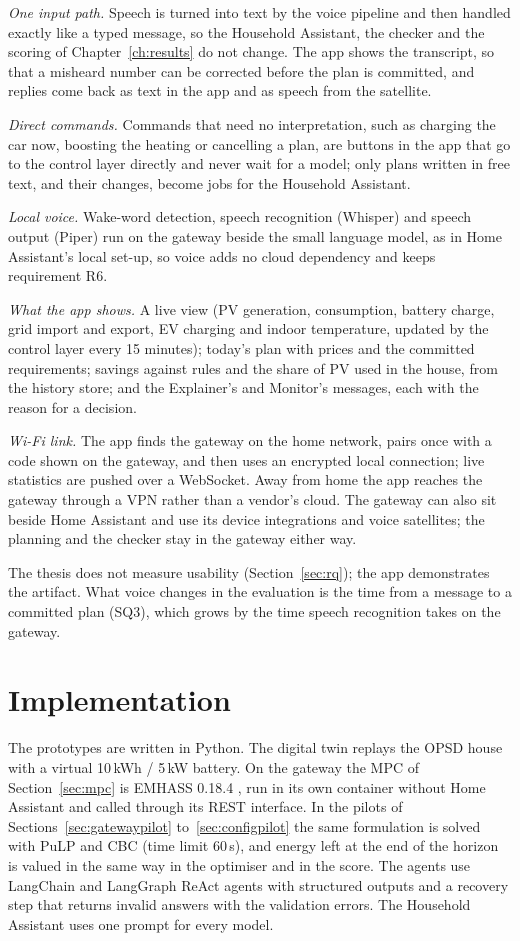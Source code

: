\textit{One input path.} Speech is turned into text by the voice
pipeline and then handled exactly like a typed message, so the Household Assistant,
the checker and the scoring of Chapter~\ref{ch:results} do not change.
The app shows the transcript, so that a misheard number can be corrected
before the plan is committed, and replies come back as text in the app
and as speech from the satellite.

\textit{Direct commands.} Commands that need no interpretation, such as
charging the car now, boosting the heating or cancelling a plan, are
buttons in the app that go to the control layer directly and never wait
for a model; only plans written in free text, and their changes, become
jobs for the Household Assistant.

\textit{Local voice.} Wake-word detection, speech recognition (Whisper)
and speech output (Piper) run on the gateway beside the small language
model, as in Home Assistant's local set-up, so voice adds no cloud
dependency and keeps requirement R6.

\textit{What the app shows.} A live view (PV generation, consumption,
battery charge, grid import and export, EV charging and indoor
temperature, updated by the control layer every 15 minutes); today's
plan with prices and the committed requirements; savings against rules
and the share of PV used in the house, from the history store; and the
Explainer's and Monitor's messages, each with the reason for a decision.

\textit{Wi-Fi link.} The app finds the gateway on the home network,
pairs once with a code shown on the gateway, and then uses an encrypted
local connection; live statistics are pushed over a WebSocket. Away
from home the app reaches the gateway through a VPN rather than a
vendor's cloud. The gateway can also sit beside Home Assistant and use
its device integrations and voice satellites; the planning and the
checker stay in the gateway either way.

The thesis does not measure usability (Section~\ref{sec:rq}); the app
demonstrates the artifact. What voice changes in the evaluation is the
time from a message to a committed plan (SQ3), which grows by the time
speech recognition takes on the gateway.

\section{Implementation}
\label{sec:implementation}

The prototypes are written in Python. The digital twin replays the
OPSD house with a virtual 10\,kWh / 5\,kW battery. On the gateway the
MPC of Section~\ref{sec:mpc} is EMHASS 0.18.4 \parencite{emhass}, run in
its own container without Home Assistant and called through its REST
interface. In the pilots of Sections~\ref{sec:gatewaypilot}
to~\ref{sec:configpilot} the same formulation is solved with PuLP and CBC
(time limit 60\,s), and energy left at the end of the horizon is valued
in the same way in the optimiser and in the score. The agents use LangChain and LangGraph ReAct agents with
structured outputs and a recovery step that returns invalid answers with
the validation errors. The Household Assistant uses one prompt for
every model.

